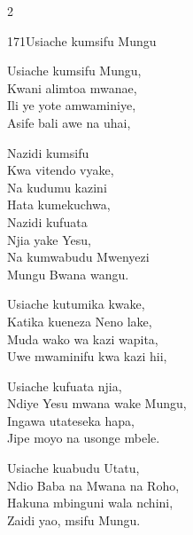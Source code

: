 \documentclass{article}
\begin{document}
\begin{multicols}{2}
\begin{hymn}{171}{Usiache kumsifu Mungu}{}
\begin{stanza}
Usiache kumsifu Mungu,\\
Kwani alimtoa mwanae,\\
Ili ye yote amwaminiye,\\
Asife bali awe na uhai,
\end{stanza}
\begin{chorus}
Nazidi kumsifu\\
Kwa vitendo vyake,\\
Na kudumu kazini\\
Hata kumekuchwa,\\
Nazidi kufuata\\
Njia yake Yesu,\\
Na kumwabudu Mwenyezi\\
Mungu Bwana wangu.
\end{chorus}
\begin{stanza}
Usiache kutumika kwake,\\
Katika kueneza Neno lake,\\
Muda wako wa kazi wapita,\\
Uwe mwaminifu kwa kazi hii,
\end{stanza}
\begin{stanza}
Usiache kufuata njia,\\
Ndiye Yesu mwana wake Mungu,\\
Ingawa utateseka hapa,\\
Jipe moyo na usonge mbele.
\end{stanza}
\begin{stanza}
Usiache kuabudu Utatu,\\
Ndio Baba na Mwana na Roho,\\
Hakuna mbinguni wala nchini,\\
Zaidi yao, msifu Mungu.
\end{stanza}
\end{hymn}


\end{multicols}
\end{document}
